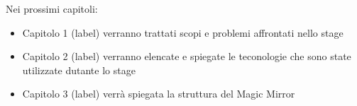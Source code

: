Nei prossimi capitoli:
\begin{itemize}
\item Capitolo 1 (label) verranno trattati scopi e problemi affrontati nello stage
\item Capitolo 2 (label) verranno elencate e spiegate le teconologie che sono state utilizzate
dutante lo stage
\item Capitolo 3 (label) verr\`a spiegata la struttura del Magic Mirror
\end{itemize}
